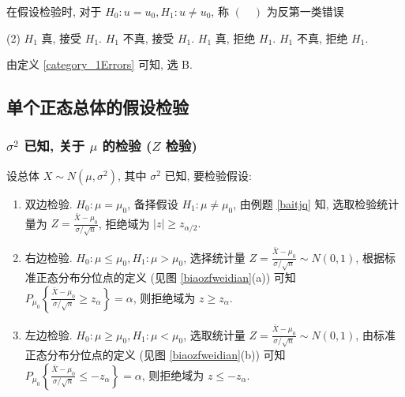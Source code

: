 \begin{example}
    在假设检验时, 对于 $H_0:u=u_0,H_1:u\neq u_0$, 称 $(\quad)$ 为反第一类错误
    \begin{tasks}(2)
        \task $H_1$ 真, 接受 $H_1$.
        \task $H_1$ 不真, 接受 $H_1$.
        \task $H_1$ 真, 拒绝 $H_1$.
        \task $H_1$ 不真, 拒绝 $H_1$.
    \end{tasks}
\end{example}
\begin{solution}
    由定义 \ref{category_1Errors} 可知, 选 B.
\end{solution}

\subsection{单个正态总体的假设检验}

\subsubsection{\texorpdfstring{$\sigma^2$}. 已知, 关于 \texorpdfstring{$\mu$}. 的检验 (\texorpdfstring{$Z$}. 检验)}

设总体 $ X \sim N\left(\mu, \sigma^{2}\right)$, 其中 $ \sigma^{2} $ 已知, 要检验假设:
\begin{enumerate}[label=(\arabic{*})]
    \item 双边检验. $ H_{0}: \mu=\mu_{0} $, 备择假设 $ H_{1}: \mu \neq \mu_{0} $,
          由例题 \ref{baitjq} 知, 选取检验统计量为 $\displaystyle Z=\frac{\bar{X}-\mu_{0}}{\sigma / \sqrt{n}}$, 拒绝域为 $ |z| \geqslant z_{\alpha / 2} .$
    \item 右边检验. $ H_{0}: \mu \leqslant \mu_{0}, H_{1}: \mu>\mu_{0} $,
          选择统计量 $\displaystyle Z=\frac{\bar{X}-\mu_{0}}{\sigma / \sqrt{n}} \sim N(0,1) $, 根据标准正态分布分位点的定义 (见图 \ref{biaozfweidian}(a)) 可知 $\displaystyle P_{\mu_{0}}\left\{\frac{\bar{X}-\mu_{0}}{\sigma / \sqrt{n}} \geqslant z_{\alpha}\right\}=\alpha $, 则拒绝域为 $ z \geqslant z_{\alpha} .$
    \item 左边检验. $ H_{0}: \mu \geqslant \mu_{0}, H_{1}: \mu<\mu_{0} $,
          选取统计量 $\displaystyle  Z=\frac{\bar{X}-\mu_{0}}{\sigma / \sqrt{n}} \sim N(0,1)$, 由标准正态分布分位点的定义 (见图 \ref{biaozfweidian}(b)) 可知 $\displaystyle P_{\mu_{0}}\left\{\frac{\bar{X}-\mu_{0}}{\sigma / \sqrt{n}} \leqslant-z_{\alpha}\right\}=\alpha$, 则拒绝域为 $ z \leqslant-z_{\alpha} .$
\end{enumerate}

